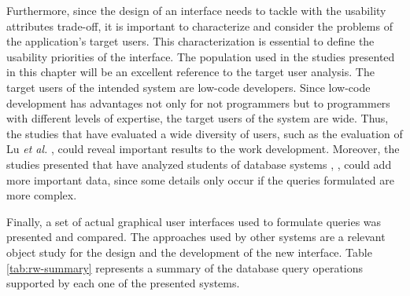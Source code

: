 Furthermore, since the design of an interface needs to tackle with the usability attributes trade-off, it is important to characterize and consider the problems of the application's target users. This characterization is essential to define the usability priorities of the interface. The population used in the studies presented in this chapter will be an excellent reference to the target user analysis. The target users of the intended system are low-code developers. Since low-code development has advantages not only for not programmers but to programmers with different levels of expertise, the target users of the system are wide. Thus, the studies that have evaluated a wide diversity of users, such as the evaluation of Lu \textit{et al.} \cite{aSurveyOnUsageOfSQL}, could reveal important results to the work development. Moreover, the studies presented that have analyzed students of database systems \cite{studentsSemanticMistakesInWritingSevenDifferentTypesOfSQLQueries}, \cite{errorsAndComplicationsInSQLQueryFormulation}, could add more important data, since some details only occur if the queries formulated are more complex.

Finally, a set of actual graphical user interfaces used to formulate queries was presented and compared. The approaches used by other systems are a relevant object study for the design and the development of the new interface. Table \ref{tab:rw-summary} represents a summary of the database query operations supported by each one of the presented systems.

